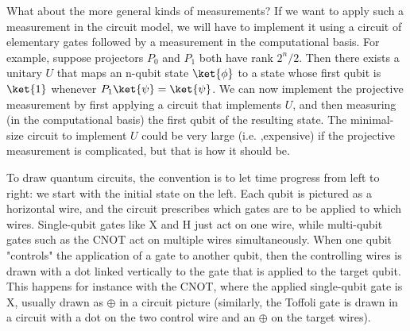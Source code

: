 \documentclass[12pt, oneside]{book}
\theoremstyle{definition}
\theoremstyle{definition}
\theoremstyle{remark}
\begin{document}
What about the more general kinds of measurements? If we want to apply such a measurement in the circuit model, we will have to implement it using a circuit of elementary gates followed by a measurement in the computational basis. For example, suppose projectors $P_0$ and $P_1$ both have rank $2^n/2$. Then there exists a unitary $U$ that maps an n-qubit state $\ket{\phi}$ to a state whose first qubit is $\ket{1}$ whenever $P_1\ket{\psi}=\ket{\psi}$. We can now implement the projective measurement by first applying a circuit that implements $U$, and then measuring (in the computational basis) the first qubit of the resulting state. The minimal-size circuit to implement $U$ could be very large (i.e. ,expensive) if the projective measurement is complicated, but that is how it should be.

To draw quantum circuits, the convention is to let time progress from left to right: we start with the initial state on the left. Each qubit is pictured as a horizontal wire, and the circuit prescribes which gates are to be applied to which wires. Single-qubit gates like X and H just act on one wire, while multi-qubit gates such as the CNOT act on multiple wires simultaneously. When one qubit "controls" the application of a gate to another qubit, then the controlling wires is drawn with a dot linked vertically to the gate that is applied to the target qubit. This happens for instance with the CNOT, where the applied single-qubit gate is X, usually drawn as $\oplus$ in a circuit picture (similarly, the Toffoli gate is drawn in a circuit with a dot on the two control wire and an $\oplus$ on the target wires).
\end{document}

